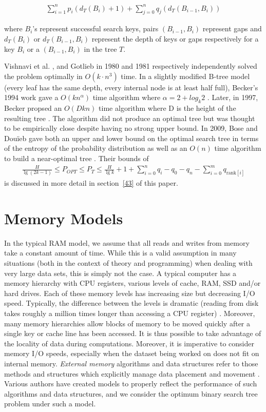 \documentclass[letterpaper,12pt,titlepage,oneside,final]{book}
\theoremstyle{plain}
\begin{document}
\begin{align*}
\sum_{i=1}^{n} p_i(d_T(B_i)+1) + \sum_{j=0}^{n} q_j(d_T(B_{i-1},B_i))
\end{align*}

\noindent where $B_i$'s represent successful search keys, pairs $(B_{i-1},B_i)$ represent gaps and $d_T(B_i)$  or $d_T(B_{i-1},B_i)$ represent the depth of keys or gaps respectively for a key $B_i$ or a $(B_{i-1},B_i)$ in the tree $T$.

Vishnavi et al. \cite{vaishnavi1980optimum}, and Gotlieb  \cite{gotlieb1981optimal} in 1980 and 1981 respectively independently solved the problem optimally in $O(k\cdot n^3)$ time. In a slightly modified B-tree model (every leaf has the same depth, every internal node is at least half full), Becker's 1994 work gave a $O(kn^{\alpha})$ time algorithm where $\alpha=2+log_k 2$ \cite{becker1994new}. Later, in 1997, Becker propsed an $O(Dkn)$ time algorithm where D is the height of the resulting tree \cite{becker1997construction}. The algorithm did not produce an optimal tree but was thought to be empirically close despite having no strong upper bound. In 2009, Bose and Dou\"{i}eb gave both an upper and lower bound on the optimal search tree in terms of the entropy of the probability distribution as well as an $O(n)$ time algorithm to build a near-optimal tree \cite{bose2009efficient}. Their bounds of
\begin{align*}
\frac{H}{\lg(2k-1)} \leq P_{OPT} \leq P_T \leq \frac{H}{\lg k} + 1 + \sum_{i=0}^n q_i - q_0 - q_n - \sum_{i=0}^m q_{\text{rank}[i]}
\end{align*}
is discussed in more detail in section~\ref{43} of this paper.

\section{Memory Models}

In the typical RAM model, we assume that all reads and writes from memory take a constant amount of time. While this is a valid assumption in many situations (both in the context of theory and programming) when dealing with very large data sets, this is simply not the case. A typical computer has a memory hierarchy with CPU registers, various levels of cache, RAM, SSD and/or hard drives. Each of these memory levels has increasing size but decreasing I/O speed. Typically, the difference between the levels is dramatic (reading from disk takes roughly a million times longer than accessing a CPU register) \cite{vitter2001external}. Moreover, many memory hierarchies allow blocks of memory to be moved quickly after a single key or cache line has been accessed. It is thus possible to take advantage of the locality of data during computations. Moreover, it is imperative to consider memory I/O speeds, especially when the dataset being worked on does not fit on internal memory. \textit{External memory} algorithms and data structures refer to those methods and structures which explicitly manage data placement and movement \cite{vitter2001external}. Various authors have created models to properly reflect the performance of such algorithms and data structures, and we consider the optimum binary search tree problem under such a model.
\end{document}

